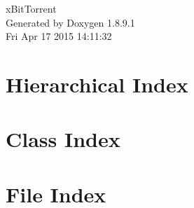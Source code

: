 \documentclass[twoside]{book}
\newcommand{\+}{\discretionary{\mbox{\scriptsize$\hookleftarrow$}}{}{}}
\newcommand{\clearemptydoublepage}{%
  \newpage{\pagestyle{empty}\cleardoublepage}%
}
\begin{document}
\hypersetup{pageanchor=false,
             bookmarks=true,
             bookmarksnumbered=true,
             pdfencoding=unicode
            }
\begin{titlepage}
\vspace*{7cm}
\begin{center}%
{\Large x\+Bit\+Torrent }\\
\vspace*{1cm}
{\large Generated by Doxygen 1.8.9.1}\\
\vspace*{0.5cm}
{\small Fri Apr 17 2015 14:11:32}\\
\end{center}
\end{titlepage}
\clearemptydoublepage
\tableofcontents
\clearemptydoublepage
{}
\hypersetup{pageanchor=true}

\chapter{Hierarchical Index}

\chapter{Class Index}

\chapter{File Index}

\end{document}

